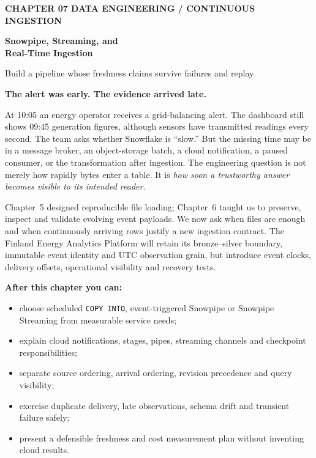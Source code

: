 \documentclass[11pt,twoside]{article}
\begin{document}
{\sffamily\bfseries\fontsize{9}{11}\selectfont\color{steelblue} CHAPTER 07 \hfill DATA ENGINEERING / CONTINUOUS INGESTION}\par\vspace{3mm}
{\sffamily\bfseries\fontsize{21.6}{25.5}\selectfont\color{navy} Snowpipe, Streaming, and\\Real-Time Ingestion}\par\vspace{2mm}
{\sffamily\fontsize{11.3}{14}\selectfont\color{steelblue} Build a pipeline whose freshness claims survive failures and replay}\par\vspace{4mm}
\begin{insight}\textbf{The alert was early. The evidence arrived late.}\par
At 10:05 an energy operator receives a grid-balancing alert. The dashboard still shows 09:45 generation figures, although sensors have transmitted readings every second. The team asks whether Snowflake is ``slow.'' But the missing time may be in a message broker, an object-storage batch, a cloud notification, a paused consumer, or the transformation after ingestion. The engineering question is not merely how rapidly bytes enter a table. It is \emph{how soon a trustworthy answer becomes visible to its intended reader}.\end{insight}
Chapter~5 designed reproducible file loading; Chapter~6 taught us to preserve, inspect and validate evolving event payloads. We now ask when files are enough and when continuously arriving rows justify a new ingestion contract. The Finland Energy Analytics Platform will retain its bronze--silver boundary, immutable event identity and UTC observation grain, but introduce event clocks, delivery offsets, operational visibility and recovery tests.
\begin{whitebox}\textbf{After this chapter you can:}
\begin{itemize}
\item choose scheduled \texttt{COPY INTO}, event-triggered Snowpipe or Snowpipe Streaming from measurable service needs;
\item explain cloud notifications, stages, pipes, streaming channels and checkpoint responsibilities;
\item separate source ordering, arrival ordering, revision precedence and query visibility;
\item exercise duplicate delivery, late observations, schema drift and transient failure safely;
\item present a defensible freshness and cost measurement plan without inventing cloud results.
\end{itemize}\end{whitebox}
\end{document}
